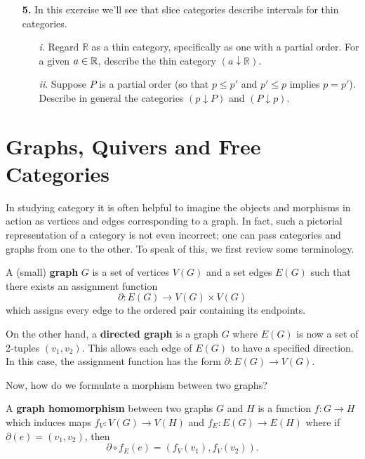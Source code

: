 \begin{itemize}
            \item[\textbf{5.}]
            In this exercise we'll see that slice categories describe intervals for thin categories.
            \begin{itemize}
                \item[\emph{i}.] Regard $\mathbb{R}$ as 
                a thin category, specifically as one with a partial order. For a given  $a \in \mathbb{R}$, 
                describe the thin category $(a \downarrow  \mathbb{R})$.

                \item[\emph{ii}.] Suppose $P$ is a partial order (so that $p \le p'$ and $p' \le p$ implies 
                $p = p'$). Describe in general the categories $(p \downarrow P)$ and $(P \downarrow p)$.
            \end{itemize}
            
        \end{itemize}

        
    \newpage
    \section{Graphs, Quivers and Free Categories}
    In studying category it is often helpful to imagine the objects
    and morphisms in action as vertices and edges corresponding to a
    graph. In fact, such a pictorial representation of a category is
    not even incorrect; one can pass categories and graphs from one to
    the other. To speak of this, we first review some terminology.
    
    \begin{definition}
        A (small) \textbf{graph} $G$ is a set of vertices $V(G)$ and a set 
        edges $E(G)$ such that there exists an assignment function
        \[
            \partial: E(G) \to V(G)\times V(G)
        \]
        which assigns every edge to the ordered pair containing its endpoints.

        On the other hand, a \textbf{directed graph} is a graph $G$ 
        where $E(G)$ is now a set of 2-tuples $(v_1, v_2)$. This allows 
        each edge of $E(G)$ to have a specified direction. In this case, 
        the assignment function has the form $\partial: E(G) \to V(G)$. 
    \end{definition}
    Now, how do we formulate a morphism between two graphs? 

    \begin{definition}
        A \textbf{graph homomorphism} between two graphs $G$ and $H$ is a 
        function $f: G \to H$ which induces maps $f_V: V(G) \to V(H)$ and
        $f_E: E(G) \to E(H)$ where if $\partial(e) = (v_1, v_2)$, then  
        \[
            \partial \circ f_E(e) = (f_V(v_1), f_V(v_2)).
        \]
    \end{definition}

